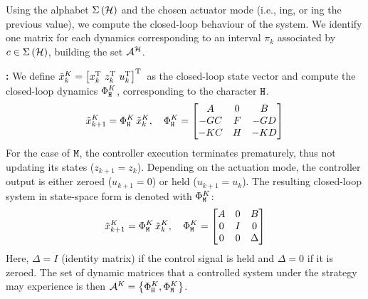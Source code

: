 Using the alphabet $\Sigma\left(\mathcal{H}\right)$ and the chosen actuator mode (i.e., \tZ{}ing, or \tH{}ing the previous value), we compute the closed-loop behaviour of the system.
We identify one matrix for each dynamics corresponding to an interval $\pi_k$ associated by $c \in \Sigma\left( \mathcal{H} \right)$, building the set $\mathcal{A}^{\mathcal{H}}$.

\textbf{\tK{}: }%
%
We define $\tilde x_k^{K} = \left[ x_k^{\mathrm{\small{T}}}{}\,\, z_k^{\mathrm{\small{T}}}{}\,\, u_k^{\mathrm{\small{T}}}{} \right]^{\mathrm{\small{T}}}{}$ as the closed-loop state vector and compute the closed-loop dynamics $\Phi{}^{K}_{\texttt{H}}$, corresponding to the character $\texttt{H}$.
\begin{equation*}
    \tilde x_{k+1}^{K} = \Phi{}^{K}_{\texttt{H}}\,\tilde x_k^{K}, \quad
    \Phi{}^{K}_{\texttt{H}} = \begin{bmatrix}
        A       & 0    & B       \\
        -GC   & F  & -GD   \\
        -KC   & H  & -KD   \\
    \end{bmatrix}
\end{equation*}
%
For the case of $\texttt{M}$, the controller execution terminates prematurely, thus not updating its states ($z_{k+1} = z_k$).
Depending on the actuation mode, the controller output is either zeroed ($u_{k+1} = 0$) or held ($u_{k+1} = u_k$).
The resulting closed-loop system in state-space form is denoted with $\Phi{}^{K}_{\texttt{M}}$:
\begin{equation*}
    \tilde x_{k+1}^{K} = \Phi{}^{K}_{\texttt{M}}\,\tilde x_k^{K}, \quad
    \Phi{}^{K}_{\texttt{M}} = \begin{bmatrix}
        A & 0  & B \\
        0   & I  & 0   \\
        0   & 0  & \Delta
    \end{bmatrix}
\end{equation*}
Here, $\Delta = I$ (identity matrix) if the control signal is held and $\Delta = 0$ if it is zeroed.
The set of dynamic matrices that a controlled system under the \tK{} strategy may experience is then $\mathcal{A}^{K}=\left\{\Phi{}^{K}_{\texttt{H}},\Phi{}^{K}_{\texttt{M}}\right\}$.

